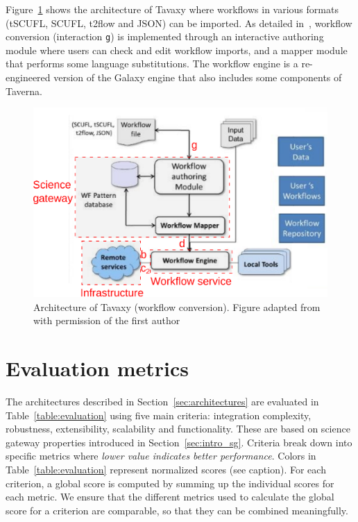 \documentclass[preprint,3p,twocolumn]{elsarticle}
\newcommand{\todo}[2]{\pdfmargincomment[color=red,author=#1,open=true]{#2}}
\newcommand{\correction}[1]{\color{blue}#1\color{black}\xspace}
\begin{document}
{Figure~\ref{fig:tavaxy} shows the architecture of Tavaxy where
workflows in various formats (tSCUFL, SCUFL, t2flow and JSON) can be
imported. As detailed in~\cite{Abouelhoda2012}, workflow conversion
(interaction \texttt{g}) is implemented through an interactive
authoring module where users can check and edit workflow imports, and
a mapper module that performs some language substitutions. The
workflow engine is a re-engineered version of the Galaxy engine that
also includes some components of Taverna.
\begin{figure}
\centering
\includegraphics[width=\columnwidth]{figures/Tavaxy.eps}
\caption{\correction{Architecture of Tavaxy (workflow conversion). Figure adapted
  from~\cite{Abouelhoda2012} with permission of the first author} \todo{approval is still pending}.}
\label{fig:tavaxy}
\end{figure}

}

\section{\correction{Evaluation metrics}}

\label{sec:metrics}

The architectures described in Section~\ref{sec:architectures} are
evaluated in Table~\ref{table:evaluation} using five main criteria:
integration complexity, robustness, extensibility, scalability and
\correction{functionality}. These are based on science gateway properties
introduced in Section~\ref{sec:intro_sg}. Criteria break down into
specific metrics where \emph{lower value indicates better
  performance}. Colors in Table~\ref{table:evaluation} represent
normalized scores (see caption). For each criterion, a global score is
computed by summing up the individual scores for each metric. We
ensure that the different metrics used to calculate the global score
for a criterion are comparable, so that they can be combined
meaningfully.
\end{document}
